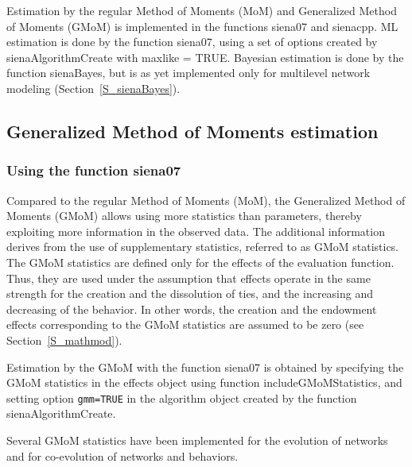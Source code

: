 \documentclass[a4paper,fleqn,11pt]{article}
\newcommand{\+}{\, + \,}
\newcommand{\sfn}[1]{\textsf{#1}}
\begin{document}
Estimation by the regular Method of Moments (MoM)
and Generalized Method of Moments (GMoM)
is implemented in the functions \sfn{siena07} and \sfn{sienacpp}.
ML estimation is done by the function \sfn{siena07}, using a set of options
created by \sfn{sienaAlgorithmCreate} with \sfn{maxlike = TRUE}.
Bayesian estimation is done by the function \sfn{sienaBayes},
but is as yet implemented only for multilevel network modeling
(Section~\ref{S_sienaBayes}).


\subsection{Generalized Method of Moments estimation}
\label{S_GMoM}

\subsubsection{Using the function \sfn{siena07}}
\label{S_GMoM_siena07}


Compared to the regular Method of Moments (MoM), the Generalized Method of
Moments (GMoM) allows using more statistics than parameters,
thereby exploiting more information in the observed data.
The additional information derives from the use of supplementary statistics,
referred to as GMoM statistics. The GMoM statistics are defined only for the effects
of the evaluation function. Thus, they are used under the assumption that
effects operate in the same strength for the creation and the dissolution of ties,
and the increasing and decreasing of the behavior. In other words,
the creation and the endowment effects
corresponding to the GMoM statistics are assumed to be zero
(see Section~\ref{S_mathmod}).
\medskip

Estimation by the GMoM with the function \sfn{siena07} is obtained
by specifying the GMoM statistics in the effects object using
function \sfn{includeGMoMStatistics},
and setting option \texttt{gmm=TRUE}
in the algorithm object created by the function \sfn{sienaAlgorithmCreate}.

Several GMoM statistics have been implemented for the evolution of networks
and for co-evolution of networks and behaviors.
\end{document}

